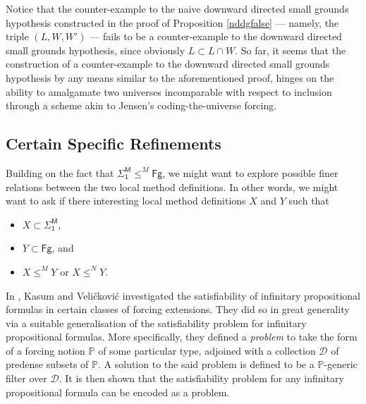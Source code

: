 \documentclass[12pt, twoside]{memoir}
\numberwithin{equation}{section}
\theoremstyle{definition}
\theoremstyle{remark}
\theoremstyle{definition}
\theoremstyle{definition}
\theoremstyle{definition}
\theoremstyle{remark}
\begin{document}
Notice that the counter-example to the naive downward directed small grounds hypothesis constructed in the proof of Proposition \ref{nddgfalse} --- namely, the triple $(L, W, W')$ --- fails to be a counter-example to the downward directed small grounds hypothesis, since obviously $L \subset L \cap W$. So far, it seems that the construction of a counter-example to the downward directed small grounds hypothesis by any means similar to the aforementioned proof, hinges on the ability to amalgamate two universes incomparable with respect to inclusion through a scheme akin to Jensen's coding-the-universe forcing.

\subsection{Certain Specific Refinements}

Building on the fact that $\mathsf{\Sigma^M_1} \leq^M \mathsf{Fg}$, we might want to explore possible finer relations between the two local method definitions. In other words, we might want to ask if there interesting local method definitions $X$ and $Y$ such that 
\begin{itemize}
    \item $X \subset \mathsf{\Sigma^M_1}$,
    \item $Y \subset \mathsf{Fg}$, and
    \item $X \leq^M Y$ or $X \leq^N Y$.
\end{itemize}

In \cite{kasum}, Kasum and Veli\v{c}kovi\'{c} investigated the satisfiability of infinitary propositional formulas in certain classes of forcing extensions. They did so in great generality via a suitable generalisation of the satisfiability problem for infinitary propositional formulas. More specifically, they defined a \emph{problem} to take the form of a forcing notion $\mathbb{P}$ of some particular type, adjoined with a collection $\mathcal{D}$ of predense subsets of $\mathbb{P}$. A solution to the said problem is defined to be a $\mathbb{P}$-generic filter over $\mathcal{D}$. It is then shown that the satisfiability problem for any infinitary propositional formula can be encoded as a problem.
\end{document}
